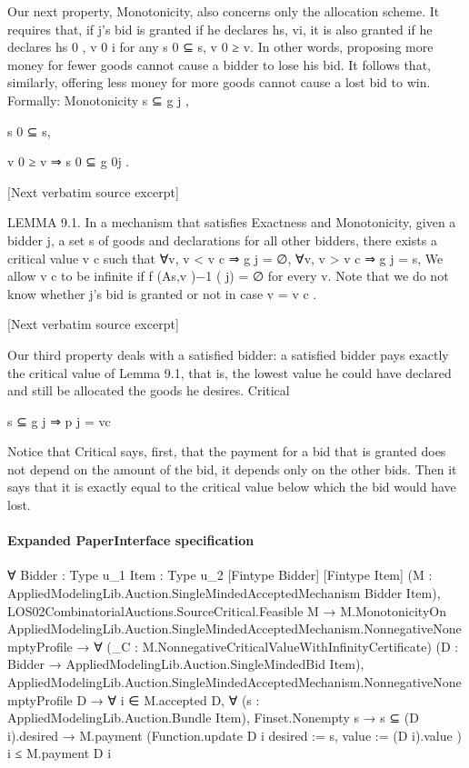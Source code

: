 \documentclass[10pt]{article}
\begin{document}
\begin{ReviewVerbatim}

Our next property, Monotonicity, also concerns only the allocation scheme. It
requires that, if j’s bid is granted if he declares hs, vi, it is also granted if he
declares hs 0 , v 0 i for any s 0 ⊆ s, v 0 ≥ v. In other words, proposing more money for
fewer goods cannot cause a bidder to lose his bid. It follows that, similarly, offering
less money for more goods cannot cause a lost bid to win. Formally:
Monotonicity s ⊆ g j ,

s 0 ⊆ s,

v 0 ≥ v ⇒ s 0 ⊆ g 0j .

[Next verbatim source excerpt]

LEMMA 9.1. In a mechanism that satisfies Exactness and Monotonicity, given
a bidder j, a set s of goods and declarations for all other bidders, there exists a
critical value v c such that
∀v, v < v c ⇒ g j = ∅,
∀v, v > v c ⇒ g j = s,
We allow v c to be infinite if f (As,v )−1 ( j) = ∅ for every v. Note that we do not
know whether j’s bid is granted or not in case v = v c .

[Next verbatim source excerpt]

Our third property deals with a satisfied bidder: a satisfied bidder pays exactly
the critical value of Lemma 9.1, that is, the lowest value he could have declared
and still be allocated the goods he desires.
Critical

s ⊆ g j ⇒ p j = vc

Notice that Critical says, first, that the payment for a bid that is granted does not
depend on the amount of the bid, it depends only on the other bids. Then it says
that it is exactly equal to the critical value below which the bid would have lost.
\end{ReviewVerbatim}



\paragraph{Expanded PaperInterface specification}
\begin{ReviewVerbatim}
∀ {Bidder : Type u_1} {Item : Type u_2} [Fintype Bidder] [Fintype Item]
  (M : AppliedModelingLib.Auction.SingleMindedAcceptedMechanism Bidder Item),
  LOS02CombinatorialAuctions.SourceCritical.Feasible M →
    M.MonotonicityOn AppliedModelingLib.Auction.SingleMindedAcceptedMechanism.NonnegativeNonemptyProfile →
      ∀ (_C : M.NonnegativeCriticalValueWithInfinityCertificate)
        (D : Bidder → AppliedModelingLib.Auction.SingleMindedBid Item),
        AppliedModelingLib.Auction.SingleMindedAcceptedMechanism.NonnegativeNonemptyProfile D →
          ∀ i ∈ M.accepted D,
            ∀ (s : AppliedModelingLib.Auction.Bundle Item),
              Finset.Nonempty s →
                s ⊆ (D i).desired →
                  M.payment (Function.update D i { desired := s, value := (D i).value }) i ≤ M.payment D i
\end{ReviewVerbatim}
\end{document}
